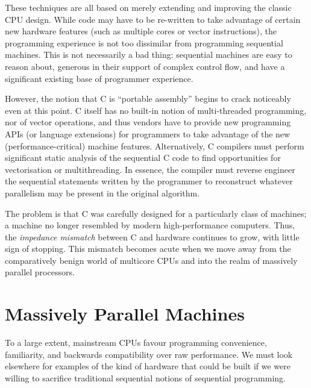These techniques are all based on merely extending and improving the
classic CPU design.  While code may have to be re-written to take
advantage of certain new hardware features (such as multiple cores or
vector instructions), the programming experience is not too dissimilar
from programming sequential machines.  This is not necessarily a bad
thing: sequential machines are easy to reason about, generous in their
support of complex control flow, and have a significant existing base
of programmer experience.

However, the notion that C is ``portable assembly'' begins to crack
noticeably even at this point.  C itself has no built-in notion of
multi-threaded programming, nor of vector operations, and thus vendors
have to provide new programming APIs (or language extensions) for
programmers to take advantage of the new (performance-critical)
machine features.  Alternatively, C compilers must perform significant
static analysis of the sequential C code to find opportunities for
vectorisation or multithreading.  In essence, the compiler must
reverse engineer the sequential statements written by the programmer
to reconstruct whatever parallelism may be present in the original
algorithm.

The problem is that C was carefully designed for a particularly class
of machines; a machine no longer resembled by modern high-performance
computers.  Thus, the \textit{impedance mismatch} between C and
hardware continues to grow, with little sign of stopping.  This
mismatch becomes acute when we move away from the comparatively benign
world of multicore CPUs and into the realm of massively parallel
processors.

\section{Massively Parallel Machines}

To a large extent, mainstream CPUs favour programming convenience,
familiarity, and backwards compatibility over raw performance.  We
must look elsewhere for examples of the kind of hardware that could be
built if we were willing to sacrifice traditional sequential notions
of sequential programming.

